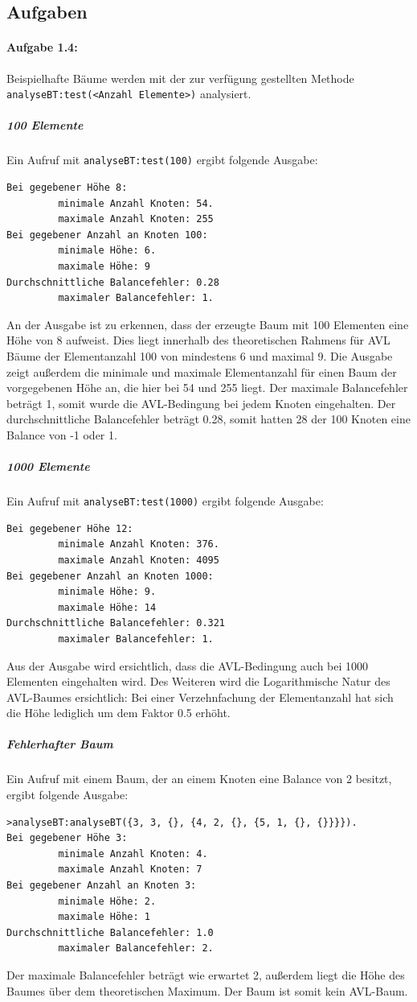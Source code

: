 \subsection{Aufgaben}

\paragraph{Aufgabe 1.4:}
Beispielhafte Bäume werden mit der zur verfügung gestellten Methode
\verb|analyseBT:test(<Anzahl Elemente>)| analysiert.
\subparagraph{100 Elemente}
Ein Aufruf mit \verb|analyseBT:test(100)| ergibt folgende Ausgabe:
\begin{verbatim}
Bei gegebener Höhe 8:
         minimale Anzahl Knoten: 54.
         maximale Anzahl Knoten: 255
Bei gegebener Anzahl an Knoten 100:
         minimale Höhe: 6.
         maximale Höhe: 9
Durchschnittliche Balancefehler: 0.28
         maximaler Balancefehler: 1.
\end{verbatim}

An der Ausgabe ist zu erkennen, dass der erzeugte Baum mit 100 Elementen eine Höhe von 8
aufweist.
Dies liegt innerhalb des theoretischen Rahmens für AVL Bäume der Elementanzahl 100 von mindestens
6 und maximal 9.
Die Ausgabe zeigt außerdem die minimale und maximale Elementanzahl für einen Baum der
vorgegebenen Höhe an, die hier bei 54 und 255 liegt.
Der maximale Balancefehler beträgt 1, somit wurde die AVL-Bedingung bei jedem Knoten eingehalten.
Der durchschnittliche Balancefehler beträgt 0.28, somit hatten 28 der 100 Knoten eine Balance
von -1 oder 1.

\subparagraph{1000 Elemente}
Ein Aufruf mit \verb|analyseBT:test(1000)| ergibt folgende Ausgabe:
\begin{verbatim}
Bei gegebener Höhe 12:
         minimale Anzahl Knoten: 376.
         maximale Anzahl Knoten: 4095
Bei gegebener Anzahl an Knoten 1000:
         minimale Höhe: 9.
         maximale Höhe: 14
Durchschnittliche Balancefehler: 0.321
         maximaler Balancefehler: 1.
\end{verbatim}

Aus der Ausgabe wird ersichtlich, dass die AVL-Bedingung auch bei 1000 Elementen eingehalten wird.
Des Weiteren wird die Logarithmische Natur des AVL-Baumes ersichtlich:
Bei einer Verzehnfachung der Elementanzahl hat sich die Höhe lediglich um dem Faktor 0.5 erhöht.

\subparagraph{Fehlerhafter Baum}
Ein Aufruf mit einem Baum, der an einem Knoten eine Balance von 2 besitzt, ergibt folgende Ausgabe:
\begin{verbatim}
>analyseBT:analyseBT({3, 3, {}, {4, 2, {}, {5, 1, {}, {}}}}).
Bei gegebener Höhe 3:
         minimale Anzahl Knoten: 4.
         maximale Anzahl Knoten: 7
Bei gegebener Anzahl an Knoten 3:
         minimale Höhe: 2.
         maximale Höhe: 1
Durchschnittliche Balancefehler: 1.0
         maximaler Balancefehler: 2.
\end{verbatim}
Der maximale Balancefehler beträgt wie erwartet 2, außerdem liegt die Höhe des Baumes über dem
theoretischen Maximum.
Der Baum ist somit kein AVL-Baum.

